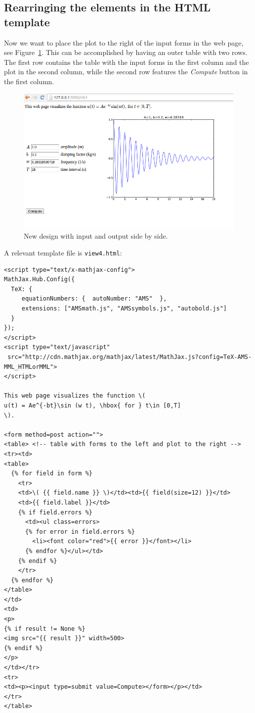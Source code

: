 \documentclass[%
oneside,                 %
final,                   %
10pt]{article}
\begin{document}
\subsection{Rearringing the elements in the HTML template}

Now we want to place the plot to the right of the input forms in
the web page, see Figure~\ref{wf:vib1:flask:fig:sidebyside}. This can
be accomplished by having an outer table with two rows. The first
row contains the table with the input forms in the first column and
the plot in the second column, while the second row features the
\emph{Compute} button in the first column.


\begin{figure}[ht]
  \centerline{\includegraphics[width=0.9\linewidth]{fig-web4sa/vib1_flask_table2.png}}
  \caption{
  New design with input and output side by side. \label{wf:vib1:flask:fig:sidebyside}
  }
\end{figure}


A relevant template file is \Verb!view4.html!:

\begin{Verbatim}[numbers=none,fontsize=\fontsize{9pt}{9pt},baselinestretch=0.85]
<script type="text/x-mathjax-config">
MathJax.Hub.Config({
  TeX: {
     equationNumbers: {  autoNumber: "AMS"  },
     extensions: ["AMSmath.js", "AMSsymbols.js", "autobold.js"]
  }
});
</script>
<script type="text/javascript"
 src="http://cdn.mathjax.org/mathjax/latest/MathJax.js?config=TeX-AMS-MML_HTMLorMML">
</script>

This web page visualizes the function \(
u(t) = Ae^{-bt}\sin (w t), \hbox{ for } t\in [0,T]
\).

<form method=post action="">
<table> <!-- table with forms to the left and plot to the right -->
<tr><td>
<table>
  {% for field in form %}
    <tr>
    <td>\( {{ field.name }} \)</td><td>{{ field(size=12) }}</td>
    <td>{{ field.label }}</td>
    {% if field.errors %}
      <td><ul class=errors>
      {% for error in field.errors %}
        <li><font color="red">{{ error }}</font></li>
      {% endfor %}</ul></td>
    {% endif %}
    </tr>
  {% endfor %}
</table>
</td>
<td>
<p>
{% if result != None %}
<img src="{{ result }}" width=500>
{% endif %}
</p>
</td></tr>
<tr>
<td><p><input type=submit value=Compute></form></p></td>
</tr>
</table>
\end{Verbatim}
\end{document}
